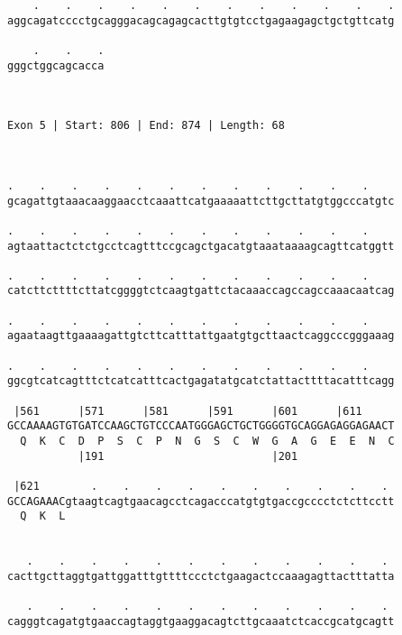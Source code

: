 \documentclass{article}
\begin{document}
\begin{Verbatim}
    .    .    .    .    .    .    .    .    .    .    .    .
aggcagatcccctgcagggacagcagagcacttgtgtcctgagaagagctgctgttcatg
                                                            
    .    .    .
gggctggcagcacca
               
               
 
Exon 5 | Start: 806 | End: 874 | Length: 68



.    .    .    .    .    .    .    .    .    .    .    .    
gcagattgtaaacaaggaacctcaaattcatgaaaaattcttgcttatgtggcccatgtc
                                                            
.    .    .    .    .    .    .    .    .    .    .    .    
agtaattactctctgcctcagtttccgcagctgacatgtaaataaaagcagttcatggtt
                                                            
.    .    .    .    .    .    .    .    .    .    .    .    
catcttcttttcttatcggggtctcaagtgattctacaaaccagccagccaaacaatcag
                                                            
.    .    .    .    .    .    .    .    .    .    .    .    
agaataagttgaaaagattgtcttcatttattgaatgtgcttaactcaggcccgggaaag
                                                            
.    .    .    .    .    .    .    .    .    .    .    .    
ggcgtcatcagtttctcatcatttcactgagatatgcatctattacttttacatttcagg
                                                            
 |561      |571      |581      |591      |601      |611     
GCCAAAAGTGTGATCCAAGCTGTCCCAATGGGAGCTGCTGGGGTGCAGGAGAGGAGAACT
  Q  K  C  D  P  S  C  P  N  G  S  C  W  G  A  G  E  E  N  C
           |191                          |201               
  
 |621        .    .    .    .    .    .    .    .    .    . 
GCCAGAAACgtaagtcagtgaacagcctcagacccatgtgtgaccgcccctctcttcctt
  Q  K  L                                                   
                                                            
  
   .    .    .    .    .    .    .    .    .    .    .    . 
cacttgcttaggtgattggatttgttttccctctgaagactccaaagagttactttatta
                                                            
   .    .    .    .    .    .    .    .    .    .    .    . 
cagggtcagatgtgaaccagtaggtgaaggacagtcttgcaaatctcaccgcatgcagtt
                                                            

\end{Verbatim}
\end{document}

